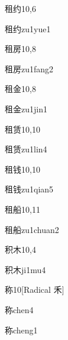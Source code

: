 \begin{entry}{租约}{10,6}
  \begin{phonetics}{租约}{zu1yue1}
  \end{phonetics}
\end{entry}

\begin{entry}{租房}{10,8}
  \begin{phonetics}{租房}{zu1fang2}
  \end{phonetics}
\end{entry}

\begin{entry}{租金}{10,8}
  \begin{phonetics}{租金}{zu1jin1}
  \end{phonetics}
\end{entry}

\begin{entry}{租赁}{10,10}
  \begin{phonetics}{租赁}{zu1lin4}
  \end{phonetics}
\end{entry}

\begin{entry}{租钱}{10,10}
  \begin{phonetics}{租钱}{zu1qian5}
  \end{phonetics}
\end{entry}

\begin{entry}{租船}{10,11}
  \begin{phonetics}{租船}{zu1chuan2}
  \end{phonetics}
\end{entry}

\begin{entry}{积木}{10,4}
  \begin{phonetics}{积木}{ji1mu4}
  \end{phonetics}
\end{entry}

\begin{entry}{称}{10}[Radical 禾]
  \begin{phonetics}{称}{chen4}
  \end{phonetics}
  \begin{phonetics}{称}{cheng1}
  \end{phonetics}
\end{entry}

